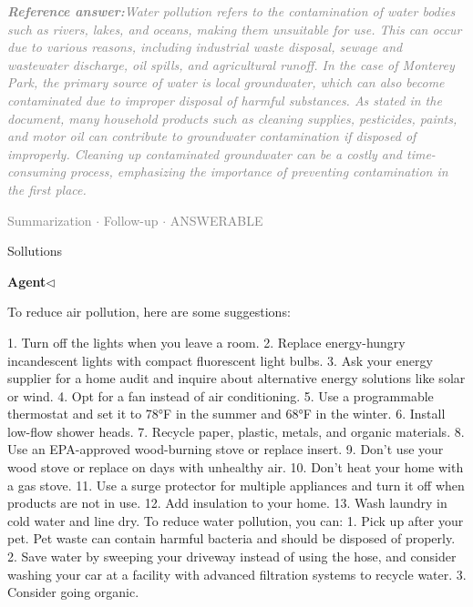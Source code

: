\documentclass[a4paper,11pt]{article}
\begin{document}
\begin{refanswerenv}
{\footnotesize\textit{\textcolor{gray}{\textbf{Reference answer:}\enspace Water pollution refers to the contamination of water bodies such as rivers, lakes, and oceans, making them unsuitable for use. This can occur due to various reasons, including industrial waste disposal, sewage and wastewater discharge, oil spills, and agricultural runoff. In the case of Monterey Park, the primary source of water is local groundwater, which can also become contaminated due to improper disposal of harmful substances. As stated in the document, many household products such as cleaning supplies, pesticides, paints, and motor oil can contribute to groundwater contamination if disposed of improperly. Cleaning up contaminated groundwater can be a costly and time-consuming process, emphasizing the importance of preventing contamination in the first place.}}}
\end{refanswerenv}
\vspace{0.5em}
\hfill{\tiny\textcolor{gray}{Summarization $\cdot$ Follow-up $\cdot$ ANSWERABLE}}
\begin{userbubble}
Sollutions
\end{userbubble}
\noindent\hfill{\small\textcolor{agentcolor}{\textbf{Agent\enspace$\triangleleft$}}}
\begin{agentbubble}
To reduce air pollution, here are some suggestions:

1. Turn off the lights when you leave a room.
2. Replace energy-hungry incandescent lights with compact fluorescent light bulbs.
3. Ask your energy supplier for a home audit and inquire about alternative energy solutions like solar or wind.
4. Opt for a fan instead of air conditioning.
5. Use a programmable thermostat and set it to 78°F in the summer and 68°F in the winter.
6. Install low-flow shower heads.
7. Recycle paper, plastic, metals, and organic materials.
8. Use an EPA-approved wood-burning stove or replace insert.
9. Don’t use your wood stove or replace on days with unhealthy air.
10. Don’t heat your home with a gas stove.
11. Use a surge protector for multiple appliances and turn it off when products are not in use.
12. Add insulation to your home.
13. Wash laundry in cold water and line dry.
To reduce water pollution, you can:
1. Pick up after your pet. Pet waste can contain harmful bacteria and should be disposed of properly.
2. Save water by sweeping your driveway instead of using the hose, and consider washing your car at a facility with advanced filtration systems to recycle water.
3. Consider going organic.
\end{agentbubble}
\end{document}
